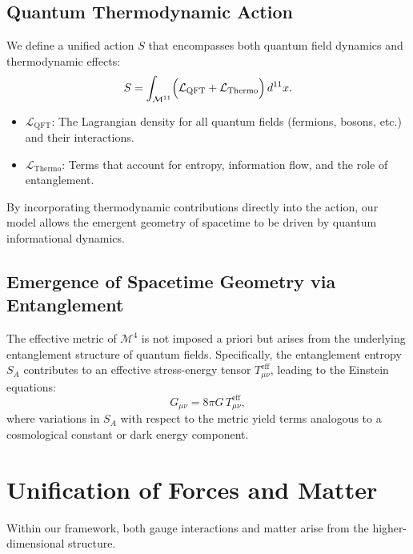 \documentclass[12pt, a4paper]{article}
\begin{document}
\subsection{Quantum Thermodynamic Action}
We define a unified action \(S\) that encompasses both quantum field dynamics and thermodynamic effects:
\begin{equation}
    S = \int_{\mathcal{M}^{11}} \Bigl( \mathcal{L}_{\text{QFT}} + \mathcal{L}_{\text{Thermo}} \Bigr) \, d^{11}x.
\end{equation}
\begin{itemize}
    \item \(\mathcal{L}_{\text{QFT}}\): The Lagrangian density for all quantum fields (fermions, bosons, etc.) and their interactions.
    \item \(\mathcal{L}_{\text{Thermo}}\): Terms that account for entropy, information flow, and the role of entanglement.
\end{itemize}
By incorporating thermodynamic contributions directly into the action, our model allows the emergent geometry of spacetime to be driven by quantum informational dynamics.

\subsection{Emergence of Spacetime Geometry via Entanglement}
The effective metric of \(\mathcal{M}^4\) is not imposed a priori but arises from the underlying entanglement structure of quantum fields. Specifically, the entanglement entropy \(S_A\) contributes to an effective stress-energy tensor \(T_{\mu\nu}^{\text{eff}}\), leading to the Einstein equations:
\begin{equation}
    G_{\mu\nu} = 8\pi G\, T_{\mu\nu}^{\text{eff}},
\end{equation}
where variations in \(S_A\) with respect to the metric yield terms analogous to a cosmological constant or dark energy component.

\section{Unification of Forces and Matter}
Within our framework, both gauge interactions and matter arise from the higher-dimensional structure.
\end{document}
